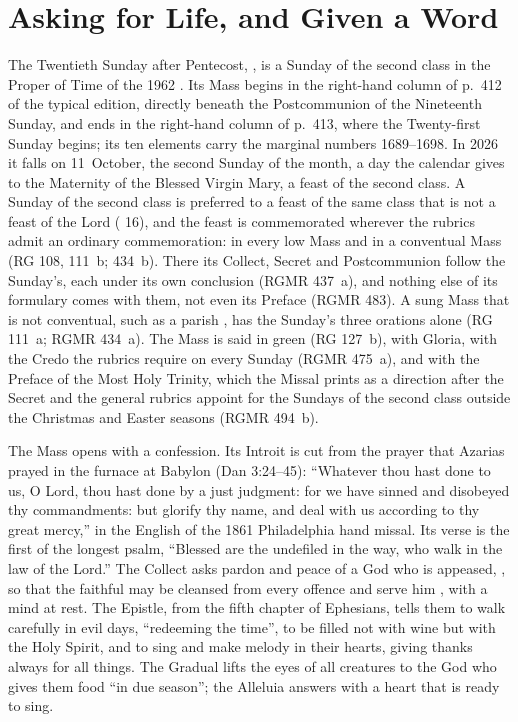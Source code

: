 \section{Asking for Life, and Given a Word}
\label{sec:opening}

The Twentieth Sunday after Pentecost, , is a Sunday of the second class in the Proper of Time of the 1962
. Its Mass begins in the right-hand column of p.~412 of
the typical edition, directly beneath the Postcommunion of the Nineteenth
Sunday, and ends in the right-hand column of p.~413, where the Twenty-first
Sunday begins; its ten elements carry the marginal numbers 1689--1698. In 2026
it falls on 11~October, the second Sunday of the month, a day the calendar gives
to the Maternity of the Blessed Virgin Mary, a feast of the second class. A
Sunday of the second class is preferred to a feast of the same class that is not
a feast of the Lord ( 16), and the feast is
commemorated wherever the rubrics admit an ordinary commemoration: in every low
Mass and in a conventual Mass (RG 108, 111~b; 
434~b). There its Collect, Secret and Postcommunion follow the Sunday's, each
under its own conclusion (RGMR 437~a), and nothing else of its formulary comes
with them, not even its Preface (RGMR 483). A sung Mass that is not conventual,
such as a parish , has the Sunday's three orations alone
(RG 111~a; RGMR 434~a). The Mass is said in green (RG 127~b), with Gloria, with
the Credo the rubrics require on every Sunday (RGMR 475~a), and with the Preface
of the Most Holy Trinity, which the Missal prints as a direction after the
Secret and the general rubrics appoint for the Sundays of the second class
outside the Christmas and Easter seasons (RGMR 494~b).

The Mass opens with a confession. Its Introit is cut from the prayer that
Azarias prayed in the furnace at Babylon (Dan 3:24--45): ``Whatever thou hast
done to us, O Lord, thou hast done by a just judgment: for we have sinned and
disobeyed thy commandments: but glorify thy name, and deal with us according to
thy great mercy,'' in the English of the 1861 Philadelphia hand missal. Its
verse is the first of the longest psalm, ``Blessed are the undefiled in the
way, who walk in the law of the Lord.'' The Collect asks pardon and peace of a
God who is appeased, , so that the faithful may be cleansed
from every offence and serve him , with a mind at rest. The
Epistle, from the fifth chapter of Ephesians, tells them to walk carefully in
evil days, ``redeeming the time'', to be filled not with wine but with the Holy
Spirit, and to sing and make melody in their hearts, giving thanks always for
all things. The Gradual lifts the eyes of all creatures to the God who gives
them food ``in due season''; the Alleluia answers with a heart that is ready to
sing.

